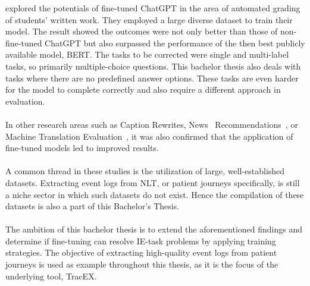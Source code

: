 \cite{latif_fine-tuning_2024} explored the potentials of fine-tuned ChatGPT in the area of automated grading of students' written work. They employed a large diverse dataset to train their model. The result showed the outcomes were not only better than those of non-fine-tuned ChatGPT but also surpassed the performance of the then best publicly available model, BERT. The tasks to be corrected were single and multi-label tasks, so primarily multiple-choice questions. This bachelor thesis also deals with tasks where there are no predefined answer options. These tasks are even harder for the model to complete correctly and also require a different approach in evaluation.\\\\
In other research areas such as Caption Rewrites, News~\cite{gladkoff_predictive_2023} Recommendations~\cite{li_exploring_2023}, or Machine Translation Evaluation~\cite{wang_mitigating_2023}, it was also confirmed that the application of fine-tuned models led to improved results.\\\\
A common thread in these studies is the utilization of large, well-established datasets. Extracting event logs from NLT, or patient journeys specifically, is still a niche sector in which such datasets do not exist. Hence the compilation of these datasets is also a part of this Bachelor's Thesis.\\\\
The ambition of this bachelor thesis is to extend the aforementioned findings and determine if fine-tuning can resolve IE-task problems by applying training strategies. The objective of extracting high-quality event logs from patient journeys is used as example throughout this thesis, as it is the focus of the underlying tool, TracEX.